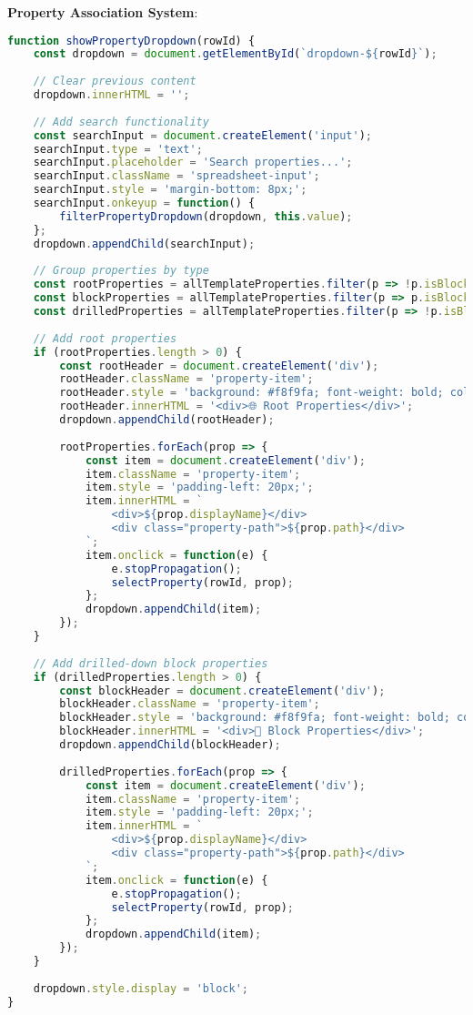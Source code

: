 \documentclass[12pt,a4paper]{article}
\begin{document}
\textbf{Property Association System}:
\begin{lstlisting}[language=JavaScript, caption=Property Dropdown System]
function showPropertyDropdown(rowId) {
    const dropdown = document.getElementById(`dropdown-${rowId}`);
    
    // Clear previous content
    dropdown.innerHTML = '';
    
    // Add search functionality
    const searchInput = document.createElement('input');
    searchInput.type = 'text';
    searchInput.placeholder = 'Search properties...';
    searchInput.className = 'spreadsheet-input';
    searchInput.style = 'margin-bottom: 8px;';
    searchInput.onkeyup = function() {
        filterPropertyDropdown(dropdown, this.value);
    };
    dropdown.appendChild(searchInput);
    
    // Group properties by type
    const rootProperties = allTemplateProperties.filter(p => !p.isBlock && !p.blockId);
    const blockProperties = allTemplateProperties.filter(p => p.isBlock);
    const drilledProperties = allTemplateProperties.filter(p => !p.isBlock && p.blockId);
    
    // Add root properties
    if (rootProperties.length > 0) {
        const rootHeader = document.createElement('div');
        rootHeader.className = 'property-item';
        rootHeader.style = 'background: #f8f9fa; font-weight: bold; color: #495057;';
        rootHeader.innerHTML = '<div>🌐 Root Properties</div>';
        dropdown.appendChild(rootHeader);
        
        rootProperties.forEach(prop => {
            const item = document.createElement('div');
            item.className = 'property-item';
            item.style = 'padding-left: 20px;';
            item.innerHTML = `
                <div>${prop.displayName}</div>
                <div class="property-path">${prop.path}</div>
            `;
            item.onclick = function(e) {
                e.stopPropagation();
                selectProperty(rowId, prop);
            };
            dropdown.appendChild(item);
        });
    }
    
    // Add drilled-down block properties
    if (drilledProperties.length > 0) {
        const blockHeader = document.createElement('div');
        blockHeader.className = 'property-item';
        blockHeader.style = 'background: #f8f9fa; font-weight: bold; color: #495057;';
        blockHeader.innerHTML = '<div>🔧 Block Properties</div>';
        dropdown.appendChild(blockHeader);
        
        drilledProperties.forEach(prop => {
            const item = document.createElement('div');
            item.className = 'property-item';
            item.style = 'padding-left: 20px;';
            item.innerHTML = `
                <div>${prop.displayName}</div>
                <div class="property-path">${prop.path}</div>
            `;
            item.onclick = function(e) {
                e.stopPropagation();
                selectProperty(rowId, prop);
            };
            dropdown.appendChild(item);
        });
    }
    
    dropdown.style.display = 'block';
}
\end{lstlisting}
\end{document}
